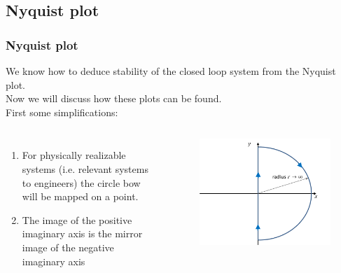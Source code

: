 \subsection{Nyquist plot}

\begin{frame}
	\frametitle{Nyquist plot}
	We know how to deduce stability of the closed loop system from the Nyquist plot.\\
	Now we will discuss how these plots can be found.\\
	\smallskip
	First some simplifications:
	\vspace{-1ex}
	\begin{columns}
		\begin{enumerate}
			\item For physically realizable systems (i.e. relevant systems to engineers) the circle bow will be mapped on a point.
			\item The image of the positive imaginary axis is the mirror image of the negative imaginary axis
		\end{enumerate}
		\vspace{-2ex}
		\begin{figure}
			\includegraphics[width=1\linewidth]{nyquist_plot}
		\end{figure}
	\end{columns}
\end{frame}

